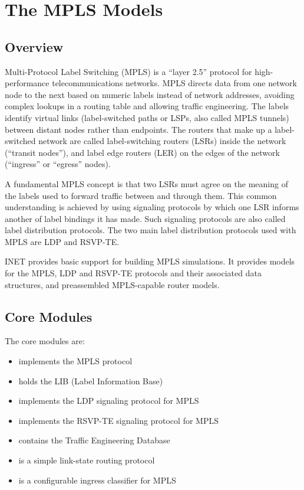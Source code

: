\chapter{The MPLS Models}
\label{cha:mpls}

\section{Overview}
\label{sec:mpls:overview}

Multi-Protocol Label Switching (MPLS) is a ``layer 2.5'' protocol for
high-performance telecommunications networks. MPLS directs data from one network
node to the next based on numeric labels instead of network addresses, avoiding
complex lookups in a routing table and allowing traffic engineering.
The labels identify virtual links (label-switched paths or LSPs, also
called MPLS tunnels) between distant nodes rather than endpoints. The routers
that make up a label-switched network are called label-switching routers (LSRs)
inside the network (``transit nodes''), and label edge routers (LER) on the
edges of the network (``ingress'' or ``egress'' nodes).

A fundamental MPLS concept is that two LSRs must agree on the meaning of the
labels used to forward traffic between and through them.
This common understanding is achieved by using signaling protocols by which one
LSR informs another of label bindings it has made. Such signaling protocols are
also called label distribution protocols. The two main label distribution
protocols used with MPLS are LDP and RSVP-TE.

INET provides basic support for building MPLS simulations. It provides models
for the MPLS, LDP and RSVP-TE protocols and their associated data structures,
and preassembled MPLS-capable router models.

\section{Core Modules}
\label{sec:mpls:core-modules}

The core modules are:

\begin{itemize}
  \item {} implements the MPLS protocol
  \item {} holds the LIB (Label Information Base)
  \item {} implements the LDP signaling protocol for MPLS
  \item {} implements the RSVP-TE signaling protocol for MPLS
  \item {} contains the Traffic Engineering Database
  \item {} is a simple link-state routing protocol
  \item {} is a configurable ingress classifier for MPLS
\end{itemize}

